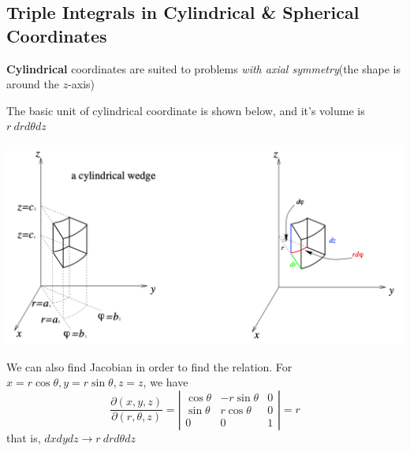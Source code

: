 \documentclass[11pt, a4paper]{MATH2023}
\begin{document}
\begin{spacing}{1.3}
    \newpage
    \section{Triple Integrals in Cylindrical \& Spherical Coordinates}

    {\bf Cylindrical} coordinates are suited to problems {\it with axial symmetry}(the shape 
    is around the $z$-axis)

    The basic unit of cylindrical coordinate is shown below, and it's volume is $r\ drd\theta dz$
    \begin{center}
        \includegraphics[scale=0.43]{images/Ch14-int-cylind.png}
    \end{center}
    We can also find Jacobian in order to find the relation. For $x=r\cos \theta, y=r\sin\theta,z=z$, we have
    $$\frac{\partial(x,y,z)}{\partial(r,\theta,z)}=
    \left|\begin{array}{ccc}
        \cos\theta & -r\sin\theta & 0\\
        \sin\theta & r\cos\theta & 0\\
        0 & 0 & 1
    \end{array}\right|=r$$
    that is, $dxdydz\rightarrow r\ drd\theta dz$

    \vspace{0.2in}
    \begin{center}
    \end{center}


\end{spacing}
\end{document}
